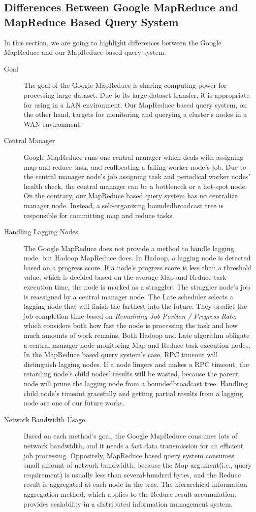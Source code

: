 \documentclass{acm_proc_article-sp}
\begin{document}
\subsection{Differences Between Google MapReduce and MapReduce Based Query System}
In this section, we are going to highlight differences between the Google MapReduce and our MapReduce based query system.
\begin{description}
\item[Goal]The goal of the Google MapReduce is sharing computing power for processing large dataset.\cite{google_mapreduce} Due to its large dataset transfer, it is appropriate for using in a LAN environment.
Our MapReduce based query system, on the other hand, targets for monitoring and querying a cluster's nodes in a WAN environment.
\item[Central Manager]Google MapReduce runs one central manager which deals with assigning map and reduce task, and reallocating a failing worker node's job.
Due to the central manager node's job assigning task and periodical worker nodes' health check, the central manager can be a bottleneck or a hot-spot node. 
On the contrary, our MapReduce based query system has no centralize manager node. Instead, a self-organizing boundedbroadcast tree is responsible for committing map and reduce tasks.
\item[Handling Lagging Nodes]The Google MapReduce does not provide a method to handle lagging node, but Hadoop MapReduce does. In Hadoop, a lagging node is detected based on a progress score.
If a node's progress score is less than a threshold value, which is decided based on the average Map and Reduce task execution time, the node is marked as a straggler. The straggler node's job is reassigned by a central manager node\cite{hadoop}.
The Late scheduler\cite{late} selects a lagging node that will finish the farthest into the future. They predict the job completion time based on \textit{Remaining Job Portion / Progress Rate}, which considers both
how fast the node is processing the task and how much amounts of work remains.
Both Hadoop and Late algorithm obligate a central manager node monitoring Map and Reduce task execution nodes. 
In the MapReduce based query system's case, RPC timeout will distinguish lagging nodes. If a node lingers and makes a RPC timeout, the retarding node's child nodes' results will be wasted, 
because the parent node will prune the lagging node from a boundedbroadcast tree. Handling child node's timeout gracefully and getting partial results from a lagging node are one of our future works.
\item[Network Bandwidth Usage]Based on each method's goal, the Google MapReduce consumes lots of network bandwidth, and it needs a fast data transmission for an efficient job processing. 
Oppositely, MapReduce based query system consumes small amount of network bandwidth, because the Map argument(i.e., query requirement) is usually less than several-hundred bytes, and the Reduce result is aggregated at each node in the tree.
The hierarchical information aggregation method, which applies to the Reduce result accumulation, provides scalability in a distributed information management system.\cite{astrobe}\cite{treedatamanage}
\end{description} 
\end{document}
